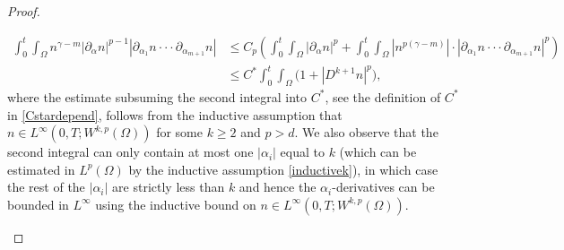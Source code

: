 \documentclass[10pt,a4paper]{amsart}
\begin{document}
\begin{proof}
\begin{itemize}
\begin{align}\label{lotest}
\int_{0}^{t} \int_{\Omega} n^{\gamma - m} |\partial_{\alpha}n|^{p - 1} |\partial_{\alpha_{1}}n \cdot \cdot \cdot \partial_{\alpha_{m+1}}n| &\le C_{p}\left(\int_{0}^{t} \int_{\Omega} |\partial_{\alpha}n|^{p} + \int_{0}^{t} \int_{\Omega} |n^{p(\gamma - m)}| \cdot  |\partial_{\alpha_{1}}n \cdot \cdot \cdot \partial_{\alpha_{m+1}}n|^{p}\right) \nonumber \\
&\le C^{*}\int_{0}^{t} \int_{\Omega} \Big(1 + |D^{k+1}n|^{p}\Big),
\end{align}
where the estimate subsuming the second integral into $C^{*}$, see the definition of $C^{*}$ in \eqref{Cstardepend}, follows from the inductive assumption that $n \in L^{\infty}(0, T; W^{k, p}(\Omega))$ for some $k \ge 2$ and $p > d$. We also observe that the second integral can only contain at most one $|\alpha_{i}|$ equal to $k$ (which can be estimated in $L^{p}(\Omega)$ by the inductive assumption \eqref{inductivek}), in which case the rest of the $|\alpha_{i}|$ are strictly less than $k$ and hence the $\alpha_{i}$-derivatives can be bounded in $L^{\infty}$ using the inductive bound on $n \in L^{\infty}(0, T; W^{k, p}(\Omega))$.


\end{itemize}
\end{proof}
\end{document}
